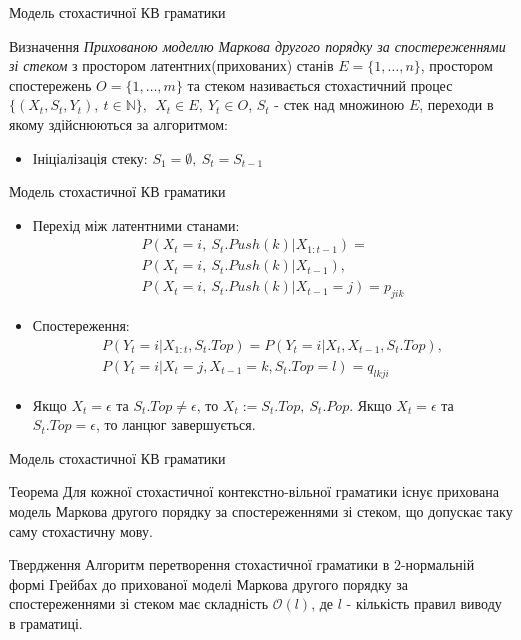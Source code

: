 \documentclass{beamer}
\begin{document}
\begin{darkframes}
    \begin{frame}{Модель стохастичної КВ граматики}
      \begin{exampleblock}{Визначення}
        \textit{Прихованою моделлю Маркова другого порядку за спостереженнями зі стеком} з простором латентних(прихованих) станів $E = \{ 1,\dots,n \}$, простором спостережень $O = \{ 1,\dots,m \}$ та стеком  називається стохастичний процес $ \{ (X_t, S_t, Y_t),\ t \in \mathbb{N} \},\ \ X_t \in E,\ Y_t \in O $, $S_t$ - стек над множиною $E$, переходи в якому здійснюються за алгоритмом:
        \begin{itemize}
          \item Ініціалізація стеку: $S_1 = \emptyset,\ S_t = S_{t-1}$

        \end{itemize}
      \end{exampleblock}
    \end{frame}

    \begin{frame}{Модель стохастичної КВ граматики}
      \begin{itemize}
        \item Перехід між латентними станами:
        \begin{multline}
          P(X_t = i,\ S_t.Push(k) | X_{1:t-1}) = \\
          P(X_t = i,\ S_t.Push(k) | X_{t-1}),\\
          P(X_t = i,\ S_t.Push(k) | X_{t-1} = j) = p_{jik}
        \end{multline}
        \item Спостереження:
        \begin{multline}
          P(Y_t = i | X_{1:t}, S_t.Top ) = P(Y_t = i | X_t, X_{t-1}, S_t.Top),\\
          P(Y_t = i | X_t = j, X_{t-1} = k, S_t.Top = l) = q_{lkji}
        \end{multline}
        \item Якщо $X_t = \epsilon$ та $ S_t.Top \neq \epsilon $, то $ X_t := S_t.Top,\ S_t.Pop $. Якщо $X_t = \epsilon$ та $ S_t.Top = \epsilon $, то ланцюг завершується.
      \end{itemize}
    \end{frame}

    \begin{frame}{Модель стохастичної КВ граматики}
      \begin{block}{Теорема}
        Для кожної стохастичної контекстно-вільної граматики існує прихована модель Маркова другого порядку за спостереженнями зі стеком, що допускає таку саму стохастичну мову.
      \end{block}
      \begin{block}{Твердження}
      Алгоритм перетворення стохастичної граматики в 2-нормальній формі Грейбах до прихованої моделі Маркова другого порядку за спостереженнями зі стеком має складність $\mathcal{O}(l)$, де $l$ - кількість правил виводу в граматиці.
      \end{block}


\end{frame}
\end{darkframes}
\end{document}
